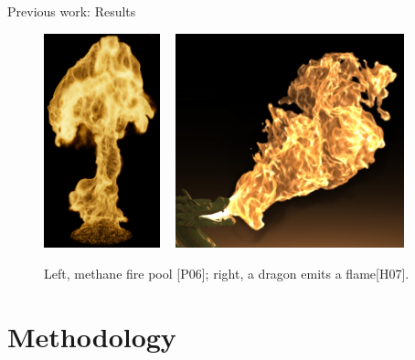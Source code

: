 \documentclass{beamer}
\begin{document}
\begin{frame}{Previous work: Results}

\begin{figure}[t!]
\begin{center}
\includegraphics[width=0.3\textwidth]{img/pegoraro_2006} 
~
\includegraphics[width=0.59\textwidth]{img/hong_2007}
\caption*{\tiny{Left, methane fire pool [P06]; right, a dragon emits a flame[H07].}}
\end{center}
\end{figure}

\end{frame}

\section{Methodology}
\subsection{ }
\end{document}
